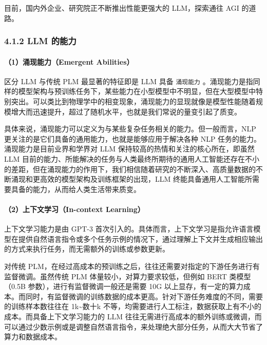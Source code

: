 \documentclass[
]{article}
\begin{document}
目前，国内外企业、研究院正不断推出性能更强大的 LLM，探索通往 AGI
的道路。

\subsubsection{4.1.2 LLM 的能力}\label{llm-ux7684ux80fdux529b}

\paragraph{（1）涌现能力（Emergent
Abilities）}\label{ux6d8cux73b0ux80fdux529bemergent-abilities}

区分 LLM 与传统 PLM 最显著的特征即是 LLM 具备 \texttt{涌现能力}
。涌现能力是指同样的模型架构与预训练任务下，某些能力在小型模型中不明显，但在大型模型中特别突出。可以类比到物理学中的相变现象，涌现能力的显现就像是模型性能随着规模增大而迅速提升，超过了随机水平，也就是我们常说的量变引起了质变。

具体来说，涌现能力可以定义为与某些复杂任务相关的能力。但一般而言，NLP
更关注的是它们具备的通用能力，也就是能够应用于解决各种 NLP
任务的能力。涌现能力是目前业界和学界对 LLM
保持较高的热情和关注的核心所在，即虽然 LLM
目前的能力、所能解决的任务与人类最终所期待的通用人工智能还存在不小的差距，但在涌现能力的作用下，我们相信随着研究的不断深入、高质量数据的不断涌现和更高效的模型架构及训练框架的出现，LLM
终能具备通用人工智能所需要具备的能力，从而给人类生活带来质变。

\paragraph{（2）上下文学习（In-context
Learning）}\label{ux4e0aux4e0bux6587ux5b66ux4e60in-context-learning}

上下文学习能力是由 GPT-3
首次引入的。具体而言，上下文学习是指允许语言模型在提供自然语言指令或多个任务示例的情况下，通过理解上下文并生成相应输出的方式来执行任务，而无需额外的训练或参数更新。

对传统
PLM，在经过高成本的预训练之后，往往还需要对指定的下游任务进行有监督微调。虽然传统
PLM 体量较小，对算力要求较低，但例如 BERT 类模型（0.5B
参数），进行有监督微调一般还是需要 10G
以上显存，有一定的算力成本。而同时，有监督微调的训练数据的成本更高。针对下游任务难度的不同，需要的训练样本数往往在
1k\textasciitilde 数十k
不等，均需要进行人工标注，数据获取上有不小的成本。而具备上下文学习能力的
LLM
往往无需进行高成本的额外训练或微调，而可以通过少数示例或是调整自然语言指令，来处理绝大部分任务，从而大大节省了算力和数据成本。
\end{document}

